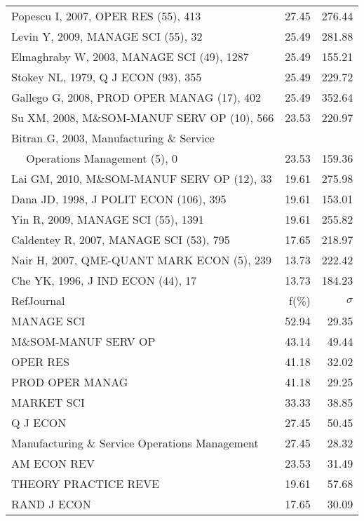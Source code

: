\documentclass[a4paper,11pt]{report}
\begin{document}
\begin{landscape}
\begin{table}[!ht]
{\begin{tabular}{|l r r|}
Popescu I, 2007, OPER RES (55), 413 & 27.45 & 276.44\\
Levin Y, 2009, MANAGE SCI (55), 32 & 25.49 & 281.88\\
Elmaghraby W, 2003, MANAGE SCI (49), 1287 & 25.49 & 155.21\\
Stokey NL, 1979, Q J ECON (93), 355 & 25.49 & 229.72\\
Gallego G, 2008, PROD OPER MANAG (17), 402 & 25.49 & 352.64\\
Su XM, 2008, M\&SOM-MANUF SERV OP (10), 566 & 23.53 & 220.97\\
Bitran G, 2003, Manufacturing \& Service &  & \\
$\quad$ Operations Management (5), 0 & 23.53 & 159.36\\
Lai GM, 2010, M\&SOM-MANUF SERV OP (12), 33 & 19.61 & 275.98\\
Dana JD, 1998, J POLIT ECON (106), 395 & 19.61 & 153.01\\
Yin R, 2009, MANAGE SCI (55), 1391 & 19.61 & 255.82\\
Caldentey R, 2007, MANAGE SCI (53), 795 & 17.65 & 218.97\\
Nair H, 2007, QME-QUANT MARK ECON (5), 239 & 13.73 & 222.42\\
Che YK, 1996, J IND ECON (44), 17 & 13.73 & 184.23\\
\hline
\hline
RefJournal & f(\%) & $\sigma$\\
\hline
MANAGE SCI & 52.94 & 29.35\\
M\&SOM-MANUF SERV OP & 43.14 & 49.44\\
OPER RES & 41.18 & 32.02\\
PROD OPER MANAG & 41.18 & 29.25\\
MARKET SCI & 33.33 & 38.85\\
Q J ECON & 27.45 & 50.45\\
Manufacturing \& Service Operations Management & 27.45 & 28.32\\
AM ECON REV & 23.53 & 31.49\\
THEORY PRACTICE REVE & 19.61 & 57.68\\
RAND J ECON & 17.65 & 30.09\\
\hline
\end{tabular}
}
\end{table}

\clearpage


\end{landscape}
\end{document}
